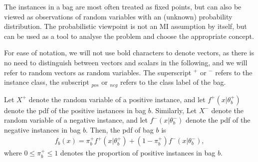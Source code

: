 The instances in a bag are most often treated as fixed points, but can also be viewed as observations of random variables with an (unknown) probability distribution. 
The probabilistic viewpoint is not an MI assumption by itself, but can be used as a tool to analyse the problem and choose the appropriate concept. 

For ease of notation, we will not use bold characters to denote vectors, as there is no need to distinguish between vectors and scalars in the following, and we will refer to random vectors as random variables.
The superscript $^+$ or $^-$ refers to the instance class, the subscript $_{pos}$ or $_{neg}$ refers to the class label of the bag. 

Let $X^+$ denote the random variable of a positive instance, and let $f^+(x|\theta_b^+)$ denote the pdf of the positive instances in bag $b$. 
Similarly, Let $X^-$ denote the random variable of a negative instance, and let $f^-(x|\theta_b^-)$ denote the pdf of the negative instances in bag $b$. 
Then, the pdf of bag $b$ is
\begin{align}
  f_b(x) = \pi^+_b f^+(x|\theta_b^+) + (1-\pi^+_b)f^-(x|\theta_b^-),
\end{align}
where $0 \leq \pi^+_b \leq 1$ denotes the proportion of positive instances in bag $b$. 

